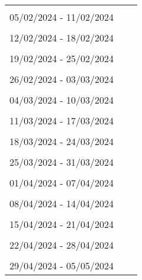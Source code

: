 \begin{table} [htb]
\centering
\begin{tabular}{p{10cm}c r} \\
\hline \\ 
 05/02/2024 - 11/02/2024\\ 
\hline \\ 
 12/02/2024 - 18/02/2024\\ 
\hline \\ 
 19/02/2024 - 25/02/2024\\ 
\hline \\ 
 26/02/2024 - 03/03/2024\\ 
\hline \\ 
 04/03/2024 - 10/03/2024\\ 
\hline \\ 
 11/03/2024 - 17/03/2024\\ 
\hline \\ 
 18/03/2024 - 24/03/2024\\ 
\hline \\ 
 25/03/2024 - 31/03/2024\\ 
\hline \\ 
 01/04/2024 - 07/04/2024\\ 
\hline \\ 
 08/04/2024 - 14/04/2024\\ 
\hline \\ 
 15/04/2024 - 21/04/2024\\ 
\hline \\ 
 22/04/2024 - 28/04/2024\\ 
\hline \\ 
 29/04/2024 - 05/05/2024\\ 
\bottomrule

\end{tabular}
\end{table}
